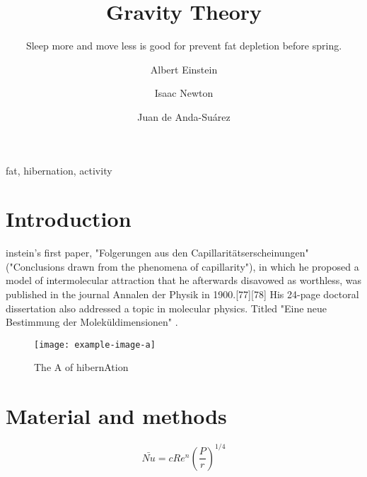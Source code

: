 \documentclass{SFEE}
\begin{document}
\twocolumn

\title{Gravity Theory}
\subtitle{Sleep more and move less is good for prevent fat depletion before   spring.}
\author[1,*]{Albert Einstein }
\author[2]{Isaac Newton}
\author[3]{Juan de Anda-Suárez }
\maketitle
\begin{abstract}
    \lipsum[5]
\end{abstract}
\begin{keywords}
    fat, hibernation, activity
\end{keywords}

\section{Introduction}

instein's first paper, "Folgerungen aus den Capillaritätserscheinungen" ("Conclusions drawn from the phenomena of capillarity"), in which he proposed a model of intermolecular attraction that he afterwards disavowed as worthless, was published in the journal Annalen der Physik in 1900.[77][78] His 24-page doctoral dissertation also addressed a topic in molecular physics. Titled "Eine neue Bestimmung der Moleküldimensionen" \cite{andacalzadaortiz2022}.

\begin{figure}[b!]
\texttt{[image: example-image-a]}
\caption{The A of hibernAtion}
\end{figure}
\lipsum[10-13]
\section{Material and methods}
\lipsum[14-17]
\begin{equation}
 \bar{Nu}=cRe^{n}\left ( \frac{P}{r} \right )^{1/4}
\end{equation}
\end{document}
